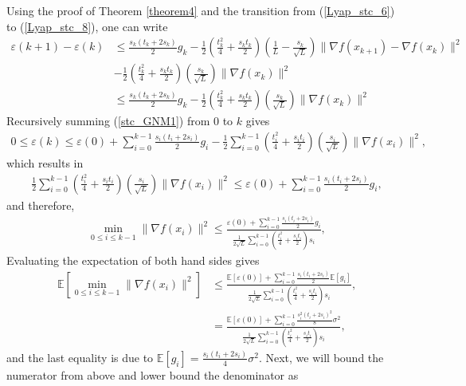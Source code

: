 \documentclass{article}
\theoremstyle{plain}
\theoremstyle{definition}
\theoremstyle{remark}
\begin{document}
Using the proof of Theorem \ref{theorem4} and the transition from (\ref{Lyap_stc_6}) to (\ref{Lyap_stc_8}), one can write
\begin{align}\label{stc_GNM1}
    \varepsilon(k+1)-\varepsilon(k)&\leq \frac{s_k(t_k+2s_k)}{2}g_k-\frac{1}{2}\left( \frac{t_k^2}{4}+\frac{s_kt_k}{2} \right)(\frac{1}{L}-\frac{s_k}{\sqrt{L}})\|\nabla f(x_{k+1})-\nabla f(x_k)\|^2\nonumber\\
    &-\frac{1}{2}\left(\frac{t_k^2}{4}+\frac{s_kt_k}{2}\right)(\frac{s_k}{\sqrt{L}})\|\nabla f(x_k)\|^2\nonumber\\
    &\leq \frac{s_k(t_k+2s_k)}{2}g_k-\frac{1}{2}\left(\frac{t_k^2}{4}+\frac{s_kt_k}{2}\right)(\frac{s_k}{\sqrt{L}})\|\nabla f(x_k)\|^2
\end{align}
Recursively summing (\ref{stc_GNM1}) from $0$ to $k$ gives
\begin{align}\label{stc_GNM2}
    0\leq\varepsilon(k)\leq \varepsilon(0)+ \sum_{i=0}^{k-1} \frac{s_i(t_i+2s_i)}{2}g_i -\frac{1}{2}\sum_{i=0}^{k-1}\left(\frac{t_i^2}{4}+\frac{s_it_i}{2}\right)(\frac{s_i}{\sqrt{L}})\|\nabla f(x_i)\|^2,
\end{align}
which results in
\begin{align}\label{stc_GNM3}
    \frac{1}{2}\sum_{i=0}^{k-1}\left(\frac{t_i^2}{4}+\frac{s_it_i}{2}\right)(\frac{s_i}{\sqrt{L}})\|\nabla f(x_i)\|^2\leq \varepsilon(0)+ \sum_{i=0}^{k-1} \frac{s_i(t_i+2s_i)}{2}g_i,
\end{align}
and therefore,
\begin{align}\label{stc_GNM4}
    \min_{0\leq i\leq k-1}\|\nabla f(x_i)\|^2 \leq \frac{\varepsilon(0)+ \sum_{i=0}^{k-1} \frac{s_i(t_i+2s_i)}{2}g_i}{\frac{1}{2\sqrt{L}}\sum_{i=0}^{k-1}\left(\frac{t_i^2}{4}+\frac{s_it_i}{2}\right)s_i},
\end{align}
Evaluating the expectation of both hand sides gives
\begin{align}\label{stc_GNM4}
    \mathbb E\left[\min_{0\leq i\leq k-1}\|\nabla f(x_i)\|^2 \right]&\leq \frac{\mathbb E\left[\varepsilon(0)\right]+ \sum_{i=0}^{k-1} \frac{s_i(t_i+2s_i)}{2}\mathbb E\left[g_i\right]}{\frac{1}{2\sqrt{L}}\sum_{i=0}^{k-1}\left(\frac{t_i^2}{4}+\frac{s_it_i}{2}\right)s_i},\nonumber\\
    &= \frac{\mathbb E\left[\varepsilon(0)\right]+ \sum_{i=0}^{k-1} \frac{s_i^2(t_i+2s_i)^2}{8}\sigma^2}{\frac{1}{2\sqrt{L}}\sum_{i=0}^{k-1}\left(\frac{t_i^2}{4}+\frac{s_it_i}{2}\right)s_i},
\end{align}
and the last equality is due to $\mathbb E[g_i]= \frac{s_i(t_i+2s_i)}{4}\sigma^2$. Next, we will bound the numerator from above and lower bound the denominator as 
\end{document}
